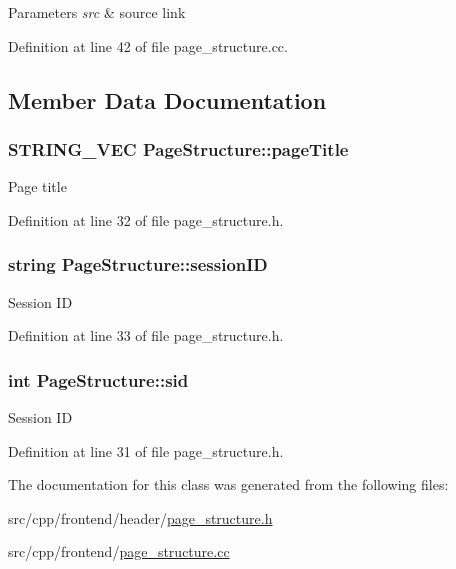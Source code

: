 \begin{DoxyParams}{Parameters}
{\em src} & source link \\
\hline
\end{DoxyParams}


Definition at line 42 of file page\-\_\-structure.\-cc.



\subsection{Member Data Documentation}
\hypertarget{classPageStructure_a7a327c938b42b50933fad2e7ec9b8869}{
\subsubsection[{page\-Title}]{\setlength{\rightskip}{0pt plus 5cm}S\-T\-R\-I\-N\-G\-\_\-\-V\-E\-C Page\-Structure\-::page\-Title\hspace{0.3cm}{\ttfamily [protected]}}}\label{classPageStructure_a7a327c938b42b50933fad2e7ec9b8869}
Page title 

Definition at line 32 of file page\-\_\-structure.\-h.

\hypertarget{classPageStructure_a1e7dca20dd65b68157b35f529d43b7a6}{
\subsubsection[{session\-I\-D}]{\setlength{\rightskip}{0pt plus 5cm}string Page\-Structure\-::session\-I\-D\hspace{0.3cm}{\ttfamily [protected]}}}\label{classPageStructure_a1e7dca20dd65b68157b35f529d43b7a6}
Session I\-D 

Definition at line 33 of file page\-\_\-structure.\-h.

\hypertarget{classPageStructure_a70428385ed3cdc60d45bd432b984f6b9}{
\subsubsection[{sid}]{\setlength{\rightskip}{0pt plus 5cm}int Page\-Structure\-::sid\hspace{0.3cm}{\ttfamily [protected]}}}\label{classPageStructure_a70428385ed3cdc60d45bd432b984f6b9}
Session I\-D 

Definition at line 31 of file page\-\_\-structure.\-h.



The documentation for this class was generated from the following files\-:\begin{DoxyCompactItemize}
\item 
src/cpp/frontend/header/\hyperlink{page__structure_8h}{page\-\_\-structure.\-h}\item 
src/cpp/frontend/\hyperlink{page__structure_8cc}{page\-\_\-structure.\-cc}\end{DoxyCompactItemize}
